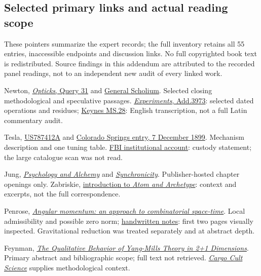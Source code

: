 \subsection*{Selected primary links and actual reading scope}
These pointers summarize the expert records; the full inventory retains all 55 entries, inaccessible endpoints and discussion links. No full copyrighted book text is redistributed. Source findings in this addendum are attributed to the recorded panel readings, not to an independent new audit of every linked work.
\begin{enumerate}[label={[\arabic*]},itemsep=4pt]
\item Newton, \href{https://www.newtonproject.ox.ac.uk/view/texts/normalized/NATP00051}{\emph{Opticks}, Query 31} and \href{https://www.newtonproject.ox.ac.uk/view/texts/normalized/NATP00056}{General Scholium}. Selected closing methodological and speculative passages. \href{https://newton.dlib.indiana.edu/text/ALCH00109/normalized}{\emph{Experiments}, Add.3973}: selected dated operations and residues; \href{https://newton.dlib.indiana.edu/text/ALCH00017/normalized}{Keynes MS.28}: English transcription, not a full Latin commentary audit.
\item Tesla, \href{https://patents.google.com/patent/US787412A/en}{US787412A} and \href{https://teslauniverse.com/nikola-tesla/books/nikola-tesla-colorado-springs-notes-1899-1900/313}{Colorado Springs entry, 7 December 1899}. Mechanism description and one tuning table. \href{https://archives.fbi.gov/archives/news/stories/2008/july/myths_072408}{FBI institutional account}: custody statement; the large catalogue scan was not read.
\item Jung, \href{https://www.jstor.org/stable/j.ctt5hhrm3}{\emph{Psychology and Alchemy}} and \href{https://www.jstor.org/stable/j.ctt7s94k}{\emph{Synchronicity}}. Publisher-hosted chapter openings only. Zabriskie, \href{https://assets.press.princeton.edu/chapters/i10235.pdf}{introduction to \emph{Atom and Archetype}}: context and excerpts, not the full correspondence.
\item Penrose, \href{https://math.ucr.edu/home/baez/penrose/Penrose-AngularMomentum.pdf}{\emph{Angular momentum: an approach to combinatorial space-time}}. Local admissibility and possible zero norm; \href{https://math.ucr.edu/home/baez/penrose/Penrose-TheoryOfQuantizedDirections.pdf}{handwritten notes}: first two pages visually inspected. Gravitational reduction was treated separately and at abstract depth.
\item Feynman, \href{https://authors.library.caltech.edu/records/t10r3-s2322}{\emph{The Qualitative Behavior of Yang-Mills Theory in 2+1 Dimensions}}. Primary abstract and bibliographic scope; full text not retrieved. \href{https://calteches.library.caltech.edu/51/2/CargoCult.htm}{\emph{Cargo Cult Science}} supplies methodological context.

\end{enumerate}
